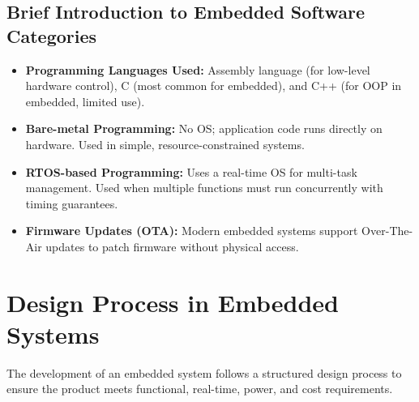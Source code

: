 \documentclass[12pt,a4paper]{article}
\begin{document}
\subsection{Brief Introduction to Embedded Software Categories}
\begin{itemize}[leftmargin=*, itemsep=3pt]
  \item \textbf{Programming Languages Used:} Assembly language (for low-level hardware control), C (most common for embedded), and C++ (for OOP in embedded, limited use).
  \item \textbf{Bare-metal Programming:} No OS; application code runs directly on hardware. Used in simple, resource-constrained systems.
  \item \textbf{RTOS-based Programming:} Uses a real-time OS for multi-task management. Used when multiple functions must run concurrently with timing guarantees.
  \item \textbf{Firmware Updates (OTA):} Modern embedded systems support Over-The-Air updates to patch firmware without physical access.
\end{itemize}

\section{Design Process in Embedded Systems}

The development of an embedded system follows a structured design process to ensure the product meets functional, real-time, power, and cost requirements.

\begin{tcolorbox}[tikzbox, title={Embedded System Design Process Flow}]
\centering
{}
\end{tcolorbox}
\end{document}
